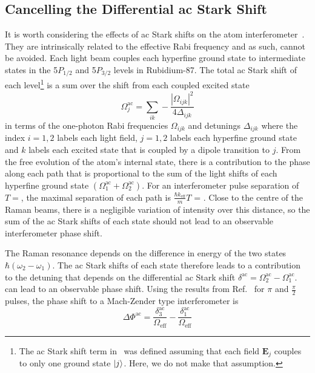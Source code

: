 \subsection{Cancelling the Differential ac Stark
Shift}\label{subsec:light_shift}
It is worth considering the effects of ac Stark shifts on the atom
interferometer~\cite{Gauguet2008}. They are intrinsically related to the
effective Rabi frequency and as such, cannot be avoided. Each light
beam couples each hyperfine ground state to intermediate states in the
5$P_{1/2}$ and 5$P_{3/2}$ levels in Rubidium-87. The total ac Stark
shift of each level\footnote{The ac Stark shift term
in~ was defined assuming that each
field $\textbf{E}_j$ couples to only one ground state $\ket{j}$. Here,
we do not make that assumption.} is a sum over the shift from each
coupled excited state
\begin{equation}
  \Omega_j^\text{ac} = \sum_{ik} -\frac{|\Omega_{ijk}|^2}{4\Delta_{ijk}}
\end{equation}
in terms of the one-photon Rabi frequencies \(\Omega_{ijk}\) and detunings \(\Delta_{ijk}\) where the index $i = 1,2$ labels each light field, $j = 1,2$ labels
each hyperfine ground state and $k$ labels each excited state that is
coupled by a dipole transition to $j$. From the free evolution of the atom's internal state, there is a contribution to the phase along each path that is
proportional to the sum of the light shifts of each hyperfine ground
state $(\Omega_1^\text{ac} +
\Omega_2^\text{ac})$. For an interferometer pulse separation of $T=
$, the maximal separation of each path is
$\frac{\hbar k_\text{eff}}{m} T$ = . Close to
the centre of the Raman beams, there is a negligible variation of
intensity over this distance, so the sum of the ac Stark shifts of
each state should not lead to an observable interferometer phase
shift.
\par\noindent
The Raman resonance depends on the difference in energy of the two
states $\hbar(\omega_2 - \omega_1)$. The ac Stark shifts of each state
therefore leads to a contribution to the detuning that depends on the differential ac Stark shift \(\delta^\text{ac}
= \Omega_2^\text{ac} - \Omega_1^\text{ac}\). can lead to an observable
phase shift. Using the results from Ref.~\cite{Weiss1994} for \(\pi\)
and \(\frac{\pi}{2}\) pulses, the phase shift to a Mach-Zender type
interferometer is
\begin{equation}
  \Delta \Phi^\text{ac} =
  \frac{\delta_3^\text{ac}}{\Omega_\text{eff}} - \frac{\delta_1^\text{ac}}{\Omega_\text{eff}} 
 \label{eq:diff_phase}
\end{equation}
